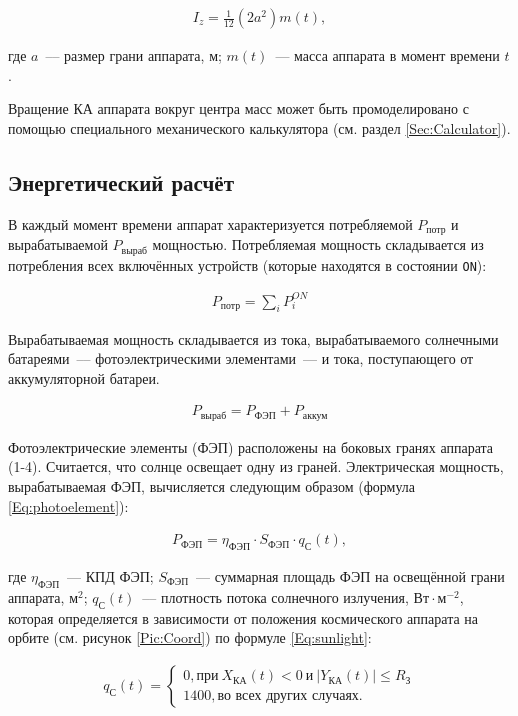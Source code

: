 \documentclass[12pt,a4paper]{article}
\begin{document}
\begin{eqnarray}
  I_z = \frac{1}{12} (2 a^2) m(t),
\end{eqnarray}

где $a$~--– размер грани аппарата, м; $m(t)$~--- масса аппарата в момент времени $t$.

Вращение КА аппарата вокруг центра масс может быть промоделировано с помощью специального
механического калькулятора (см. раздел \ref{Sec:Calculator}).

\subsection{Энергетический расчёт}

В каждый момент времени аппарат характеризуется потребляемой $P_{\text{потр}}$ и
вырабатываемой $P_{\text{выраб}}$ мощностью. Потребляемая мощность складывается из
потребления всех включённых устройств (которые находятся в состоянии \verb'ON'):

\begin{eqnarray}
  P_{\text{потр}} = \sum_i{P_{i}^{ON}}
\end{eqnarray}

Вырабатываемая мощность складывается из тока, вырабатываемого солнечными батареями~--–
фотоэлектрическими элементами~--- и тока, поступающего от аккумуляторной батареи.

\begin{eqnarray}
  P_{\text{выраб}} = P_{\text{ФЭП}} + P_{\text{аккум}}
\end{eqnarray}

Фотоэлектрические элементы (ФЭП) расположены на боковых гранях аппарата (1-4). Считается,
что солнце освещает одну из граней. Электрическая мощность, вырабатываемая ФЭП,
вычисляется следующим образом (формула \ref{Eq:photoelement}):

\begin{eqnarray}
  P_{\text{ФЭП}} = \eta_{\text{ФЭП}} \cdot S_{\text{ФЭП}} \cdot q_{\text{С}}(t), \label{Eq:photoelement}
\end{eqnarray}

где $\eta_{\text{ФЭП}}$~--- КПД ФЭП; $S_{\text{ФЭП}}$~--- суммарная площадь ФЭП на
освещённой грани аппарата, $\text{м}^2$; $q_{\text{С}}(t)$~--– плотность потока солнечного
излучения, $\text{Вт} \cdot \text{м}^{-2}$, которая определяется в зависимости от положения
космического аппарата на орбите (см. рисунок \ref{Pic:Coord}) по формуле \ref{Eq:sunlight}:

\begin{eqnarray}
  q_{\text{С}}(t) = \left\{
  \begin{array}{l}
    0, \text{при}~X_{\text{КА}}(t) < 0~\text{и}~|Y_{\text{КА}}(t)| \leqslant R_{\text{З}}\\
    1400, \text{во всех других случаях.}
  \end{array}
\right. \label{Eq:sunlight} 
\end{eqnarray}
\end{document}
